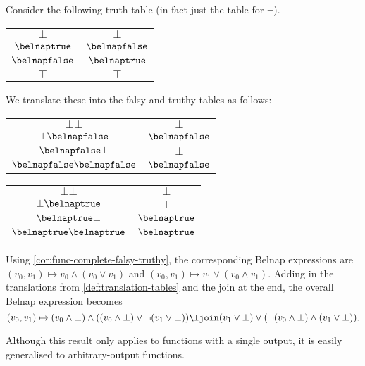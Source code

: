 \begin{example}
    Consider the following truth table (in fact just the table for \(\neg\)).
    \begin{center}
        \begin{tabular}{c|c}
            \(\bot\)         & \(\bot\)         \\
            \(\belnaptrue\)  & \(\belnapfalse\) \\
            \(\belnapfalse\) & \(\belnaptrue\)  \\
            \(\top\)         & \(\top\)
        \end{tabular}
    \end{center}
    We translate these into the falsy and truthy tables as follows:
    \begin{center}
        \begin{tabular}{c|c}
            \(\bot\bot\)                 & \(\bot\)         \\
            \(\bot\belnapfalse\)         & \(\belnapfalse\) \\
            \(\belnapfalse\bot\)         & \(\bot\)         \\
            \(\belnapfalse\belnapfalse\) & \(\belnapfalse\)
        \end{tabular}
        \begin{tabular}{c|c}
            \(\bot\bot\)               & \(\bot\)        \\
            \(\bot\belnaptrue\)        & \(\bot\)        \\
            \(\belnaptrue\bot\)        & \(\belnaptrue\) \\
            \(\belnaptrue\belnaptrue\) & \(\belnaptrue\)
        \end{tabular}
    \end{center}
    Using \cref{cor:func-complete-falsy-truthy}, the corresponding Belnap
    expressions are \(
    (v_0,v_1) \mapsto v_0 \land (v_0 \lor v_1)
    \) and \(
    (v_0,v_1) \mapsto v_1 \lor (v_0 \land v_1)
    \).
    Adding in the translations from \cref{def:translation-tables} and the join
    at the end, the overall Belnap expression becomes \[
        (v_0,v_1) \mapsto
        (v_0 \land \bot) \land ((v_0 \land \bot) \lor \neg(v_1 \lor \bot))
        \ljoin
        (v_1 \lor \bot) \lor (\neg(v_0 \land \bot) \land (v_1 \lor \bot)).
    \]
\end{example}

Although this result only applies to functions with a single output, it is
easily generalised to arbitrary-output functions.

